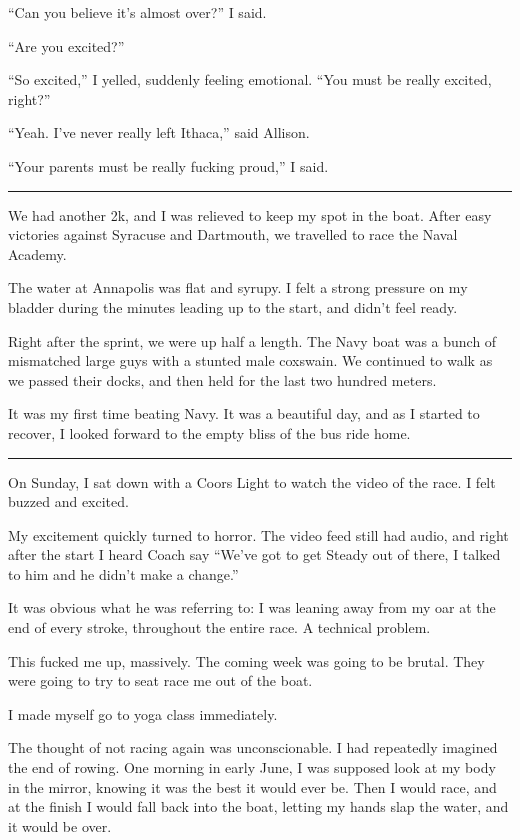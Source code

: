 ``Can you believe it's almost over?'' I said.

``Are you excited?''

``So excited,'' I yelled, suddenly feeling emotional.  ``You must be
really excited, right?''

``Yeah.  I've never really left Ithaca,'' said Allison.

``Your parents must be really fucking proud,'' I said.

\plainfancybreak{12pt}{2}{}

We had another 2k, and I was relieved to keep my spot in the boat.  After easy
victories against Syracuse and Dartmouth, we travelled to race the Naval
Academy.

The water at Annapolis was flat and syrupy.  I felt a strong pressure on my
bladder during the minutes leading up to the start, and didn't feel ready.

Right after the sprint, we were up half a length.  The Navy boat was a bunch of
mismatched large guys with a stunted male coxswain.  We continued to walk as we
passed their docks, and then held for the last two hundred meters.

It was my first time beating Navy.  It was a beautiful day, and as I started to
recover, I looked forward to the empty bliss of the bus ride home.

\plainfancybreak{12pt}{2}{}

On Sunday, I sat down with a Coors Light to watch the video of the race.  I felt
buzzed and excited.

My excitement quickly turned to horror.  The video feed still had audio, and
right after the start I heard Coach say ``We've got to get Steady out of there,
I talked to him and he didn't make a change.''

It was obvious what he was referring to: I was leaning away from my oar at the
end of every stroke, throughout the entire race.  A technical problem.

This fucked me up, massively.  The coming week was going to be brutal.  They
were going to try to seat race me out of the boat.

I made myself go to yoga class immediately.

The thought of not racing again was unconscionable.  I had repeatedly imagined
the end of rowing.  One morning in early June, I was supposed look at my body in
the mirror, knowing it was the best it would ever be.  Then I would race, and at
the finish I would fall back into the boat, letting my hands slap the water, and
it would be over.

